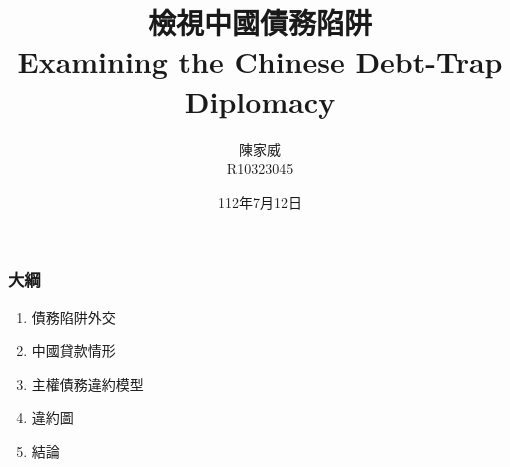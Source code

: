 \documentclass[mathserif]{beamer}
\title{檢視中國債務陷阱\\Examining the Chinese Debt-Trap Diplomacy}
\author{陳家威\\{\small R10323045}}
\date{112年7月12日}
\begin{document}
    \begin{frame}
        \maketitle
    \end{frame}

    \begin{frame}
        \frametitle{大綱}
            \begin{enumerate}
                \item 債務陷阱外交
                \item 中國貸款情形
                \item 主權債務違約模型
                \item 違約圖
                \item 結論
            \end{enumerate}
    \end{frame}
\end{document}
